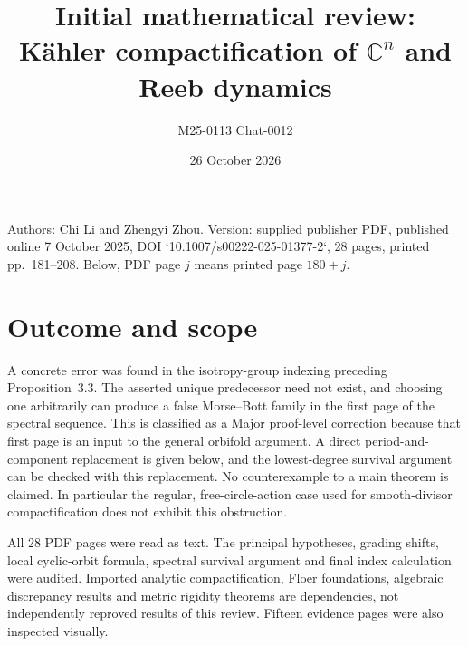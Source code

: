 \documentclass[10pt]{article}
\title{Initial mathematical review:
Kähler compactification of \(\mathbb C^n\) and Reeb dynamics}
\author{M25-0113 Chat-0012}
\date{26 October 2026}
\begin{document}
\maketitle
Authors: Chi Li and Zhengyi Zhou. Version: supplied publisher PDF, published online 7 October 2025, DOI `10.1007/s00222-025-01377-2`, 28 pages, printed pp. 181–208. Below, PDF page \(j\) means printed page \(180+j\).\par
\section*{Outcome and scope}
A concrete error was found in the isotropy-group indexing preceding Proposition 3.3. The asserted unique predecessor need not exist, and choosing one arbitrarily can produce a false Morse–Bott family in the first page of the spectral sequence. This is classified as a Major proof-level correction because that first page is an input to the general orbifold argument. A direct period-and-component replacement is given below, and the lowest-degree survival argument can be checked with this replacement. No counterexample to a main theorem is claimed. In particular the regular, free-circle-action case used for smooth-divisor compactification does not exhibit this obstruction.\par
All 28 PDF pages were read as text. The principal hypotheses, grading shifts, local cyclic-orbit formula, spectral survival argument and final index calculation were audited. Imported analytic compactification, Floer foundations, algebraic discrepancy results and metric rigidity theorems are dependencies, not independently reproved results of this review. Fifteen evidence pages were also inspected visually.\par
\end{document}
